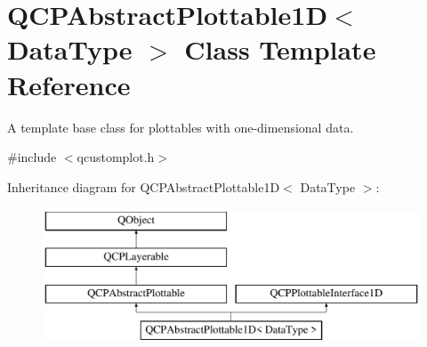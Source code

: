 \hypertarget{class_q_c_p_abstract_plottable1_d}{}\section{Q\+C\+P\+Abstract\+Plottable1D$<$ Data\+Type $>$ Class Template Reference}
\label{class_q_c_p_abstract_plottable1_d}


A template base class for plottables with one-\/dimensional data.  




{\ttfamily \#include $<$qcustomplot.\+h$>$}

Inheritance diagram for Q\+C\+P\+Abstract\+Plottable1D$<$ Data\+Type $>$\+:\begin{figure}[H]
\begin{center}
\leavevmode
\includegraphics[height=4.000000cm]{class_q_c_p_abstract_plottable1_d}
\end{center}
\end{figure}
